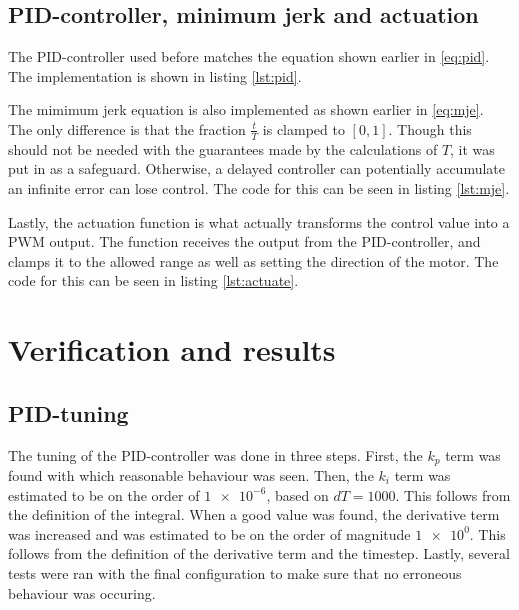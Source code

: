 \documentclass[11pt]{article}
\begin{document}


\subsection{PID-controller, minimum jerk and actuation}
The PID-controller used before matches the equation shown earlier in \vref{eq:pid}. The implementation is shown in listing \vref{lst:pid}.



The mimimum jerk equation is also implemented as shown earlier  in \vref{eq:mje}. The only difference is that the fraction $\frac{t}{T}$ is clamped to $[0,1]$. Though this should not be needed with the guarantees made by the calculations of $T$, it was put in as a safeguard. Otherwise, a delayed controller can potentially accumulate an infinite error can lose control. The code for this can be seen in listing \vref{lst:mje}.\par



Lastly, the actuation function is what actually transforms the control value into a PWM output. The function receives the output from the PID-controller, and clamps it to the allowed range as well as setting the direction of the motor. The code for this can be seen in listing \vref{lst:actuate}.




\section{Verification and results}
\subsection{PID-tuning}
The tuning of the PID-controller was done in three steps. First, the $k_p$ term was found with which reasonable behaviour was seen. Then, the $k_i$ term was estimated to be on the order of $\num{1e-6}$, based on $dT=1000$. This follows from the definition of the integral. When a good value was found, the derivative term was increased and was estimated to be on the order of magnitude $\num{1e0}$. This follows from the definition of the derivative term and the timestep. Lastly, several tests were ran with the final configuration to make sure that no erroneous behaviour was occuring. \par
\end{document}
